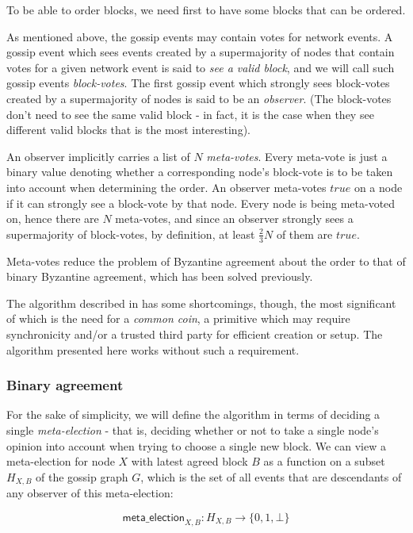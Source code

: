\documentclass[a4paper,fleqn]{article}
\begin{document}
To be able to order blocks, we need first to have some blocks that can be ordered.

As mentioned above, the gossip events may contain votes for network events. A gossip event which
sees events created by a supermajority of nodes that contain votes for a given network event is
said to \emph{see a valid block}, and we will call such gossip events \emph{block-votes}. The first
gossip event which strongly sees block-votes created by a supermajority of nodes is said to be an
\emph{observer}. (The block-votes don't need to see the same valid block - in fact, it is the case
when they see different valid blocks that is the most interesting).

An observer implicitly carries a list of $N$ \emph{meta-votes}. Every meta-vote is just a binary
value denoting whether a corresponding node's block-vote is to be taken into account when
determining the order. An observer meta-votes $true$ on a node if it can strongly see a block-vote
by that node. Every node is being meta-voted on, hence there are $N$ meta-votes, and since an
observer strongly sees a supermajority of block-votes, by definition, at least $\frac{2}{3}N$ of
them are $true$.

Meta-votes reduce the problem of Byzantine agreement about the order to that of binary Byzantine
agreement, which has been solved previously\cite{aba}.

The algorithm described in \cite{aba} has some shortcomings, though, the most significant of which
is the need for a \emph{common coin}, a primitive which may require synchronicity and/or a trusted
third party for efficient creation or setup. The algorithm presented here works without such a
requirement.

\subsubsection{Binary agreement}

For the sake of simplicity, we will define the algorithm in terms of deciding a single
\emph{meta-election} - that is, deciding whether or not to take a single node's opinion into
account when trying to choose a single new block. We can view a meta-election for node $X$ with
latest agreed block $B$ as a function on a subset $H_{X,B}$ of the gossip graph $G$, which is the
set of all events that are descendants of any observer of this meta-election:

\[ \mathsf{meta\_election}_{X,B}: H_{X,B} \to \{0, 1, \bot\} \]
\end{document}
